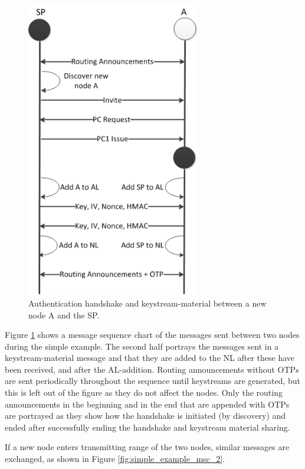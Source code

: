 \begin{figure}[ht]
	\centering
  	\includegraphics[height=13cm]{images/simple_example_msc.png}
  	\caption{Authentication handshake and keystream-material between a new node A and the SP.}
	\label{fig:simple_example_msc}
\end{figure}

Figure \ref{fig:simple_example_msc} shows a message sequence chart of the
messages sent between two nodes during the simple example. The second
half portrays the messages sent in a keystream-material message and that
they are added to the \ac{NL} after these have been received, and after
the \ac{AL}-addition. Routing announcements without \aclp{OTP} are sent
periodically throughout the sequence until keystreams are generated, but this
is left out of the figure as they do not affect the nodes. Only the routing
announcements in the beginning and in the end that are appended with \acp{OTP}
are portrayed as they show how the handshake is initiated (by discovery) and
ended after successfully ending the handshake and keystream material sharing.

If a new node enters transmitting range of the two nodes, similar messages are
exchanged, as shown in Figure \ref{fig:simple_example_msc_2}.

